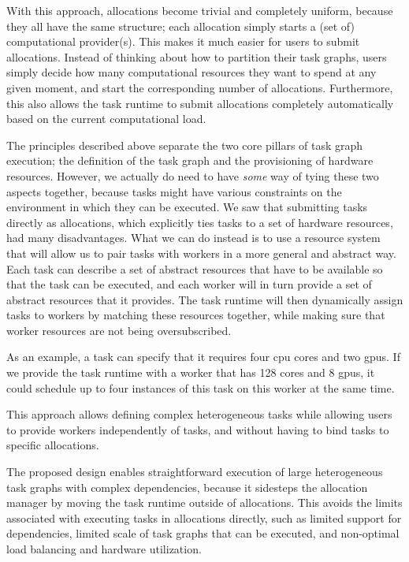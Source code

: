 \begin{description}[wide=0pt]
		With this approach, allocations become trivial and completely uniform, because they all have the
		same structure; each allocation simply starts a (set of) computational provider(s). This makes it
		much easier for users to submit allocations. Instead of thinking about how to partition their task
		graphs, users simply decide how many computational resources they want to spend at any given
		moment, and start the corresponding number of allocations. Furthermore, this also allows the task
		runtime to submit allocations completely automatically based on the current computational load.
	\item[Pair tasks with workers using abstract resources] The principles described above separate the two core pillars of task graph execution; the
		definition of the task graph and the provisioning of hardware resources. However, we actually do
		need to have \emph{some} way of tying these two aspects together, because tasks might
		have various constraints on the environment in which they can be executed. We saw that submitting
		tasks directly as allocations, which explicitly ties tasks to a set of hardware resources, had many
		disadvantages. What we can do instead is to use a resource system that will allow us to pair tasks
		with workers in a more general and abstract way. Each task can describe a set of abstract resources
		that have to be available so that the task can be executed, and each worker will in turn provide a
		set of abstract resources that it provides. The task runtime will then dynamically assign tasks to
		workers by matching these resources together, while making sure that worker resources are not being
		oversubscribed.

		As an example, a task can specify that it requires four \gls{cpu} cores and two
		\glspl{gpu}. If we provide the task runtime with a worker that has 128 cores and 8
		\glspl{gpu}, it could schedule up to four instances of this task on this worker at the
		same time.

		This approach allows defining complex heterogeneous tasks while allowing users to provide workers
		independently of tasks, and without having to bind tasks to specific allocations.
\end{description}

The proposed design enables straightforward execution of large heterogeneous task graphs with
complex dependencies, because it sidesteps the allocation manager by moving the task runtime
outside of allocations. This avoids the limits associated with executing tasks in allocations
directly, such as limited support for dependencies, limited scale of task graphs that can be
executed, and non-optimal load balancing and hardware utilization.

